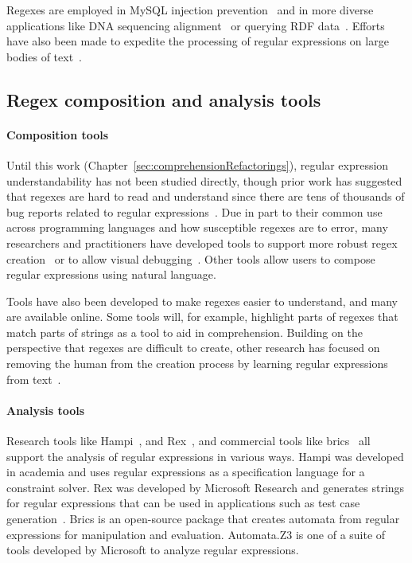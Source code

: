 Regexes are employed in MySQL injection prevention~ and in more diverse applications like DNA sequencing alignment~ or querying RDF data~.  Efforts have also been made to expedite the processing of regular expressions on large bodies of text~.

\subsection{Regex composition and analysis tools}
\paragraph{Composition tools} Until this work (Chapter~\ref{sec:comprehensionRefactorings}), regular expression understandability has not been studied directly, though prior work has suggested that regexes are hard to read and understand since there are tens of thousands of bug reports related to regular expressions~.  Due in part to their common use across programming languages and how susceptible regexes are to error, many researchers and practitioners have developed tools to support more robust regex creation~ or to allow visual debugging~.  Other tools allow users to compose regular expressions using natural language.

Tools have also been developed to make regexes easier to understand, and many are available online. Some tools will, for example, highlight parts of regexes that match parts of strings as a tool to aid in comprehension.  Building on the perspective that regexes are difficult to create, other research has focused on removing the human from the creation process by learning regular expressions from  text~.

\paragraph{Analysis tools} Research tools like Hampi~, and Rex~, and commercial tools like brics~ all support the analysis of regular expressions in various ways. Hampi was developed  in academia and uses regular expressions as a specification language for a constraint solver. Rex was developed by Microsoft Research and generates strings for regular expressions that can be used in  applications such as test case generation~. Brics is an open-source package that creates automata from regular expressions for manipulation and evaluation. Automata.Z3 is one of a suite of tools developed by Microsoft to analyze regular expressions.
